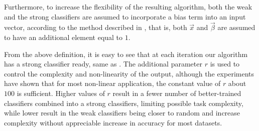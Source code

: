 Furthermore, to increase the flexibility of the resulting algorithm, both the weak and the strong classifiers are assumed to incorporate a bias term into an input vector, according to the method described in \cite{rop}, that is, both $\vec{x}$ and $\vec{\beta}$ are assumed to have an additional element equal to $1$. 

From the above definition, it is easy to see that at each iteration our algorithm has a strong classifier ready, same as \cite{OnlineBoost}. The additional parameter $r$ is used to control the complexity and non-linearity of the output, although the experiments have shown that for most non-linear application, the constant value of $r$ about $100$ is sufficient. Higher values of $r$ result in a fewer number of better-trained classifiers combined into a strong classifiers, limiting possible task complexity, while lower result in the weak classifiers  being closer to random and increase complexity without appreciable increase in accuracy for most datasets. 

